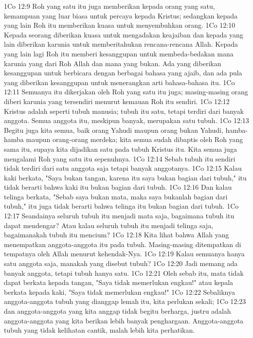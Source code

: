 1Co 12:9  Roh yang satu itu juga memberikan kepada orang yang satu, kemampuan yang luar biasa untuk percaya kepada Kristus; sedangkan kepada yang lain Roh itu memberikan kuasa untuk menyembuhkan orang.
1Co 12:10  Kepada seorang diberikan kuasa untuk mengadakan keajaiban dan kepada yang lain diberikan karunia untuk memberitahukan rencana-rencana Allah. Kepada yang lain lagi Roh itu memberi kesanggupan untuk membeda-bedakan mana karunia yang dari Roh Allah dan mana yang bukan. Ada yang diberikan kesanggupan untuk berbicara dengan berbagai bahasa yang ajaib, dan ada pula yang diberikan kesanggupan untuk menerangkan arti bahasa-bahasa itu.
1Co 12:11  Semuanya itu dikerjakan oleh Roh yang satu itu juga; masing-masing orang diberi karunia yang tersendiri menurut kemauan Roh itu sendiri.
1Co 12:12  Kristus adalah seperti tubuh manusia; tubuh itu satu, tetapi terdiri dari banyak anggota. Semua anggota itu, meskipun banyak, merupakan satu tubuh.
1Co 12:13  Begitu juga kita semua, baik orang Yahudi maupun orang bukan Yahudi, hamba-hamba maupun orang-orang merdeka; kita semua sudah dibaptis oleh Roh yang sama itu, supaya kita dijadikan satu pada tubuh Kristus itu. Kita semua juga mengalami Roh yang satu itu sepenuhnya.
1Co 12:14  Sebab tubuh itu sendiri tidak terdiri dari satu anggota saja tetapi banyak anggotanya.
1Co 12:15  Kalau kaki berkata, "Saya bukan tangan, karena itu saya bukan bagian dari tubuh," itu tidak berarti bahwa kaki itu bukan bagian dari tubuh.
1Co 12:16  Dan kalau telinga berkata, "Sebab saya bukan mata, maka saya bukanlah bagian dari tubuh," itu juga tidak berarti bahwa telinga itu bukan bagian dari tubuh.
1Co 12:17  Seandainya seluruh tubuh itu menjadi mata saja, bagaimana tubuh itu dapat mendengar? Atau kalau seluruh tubuh itu menjadi telinga saja, bagaimanakah tubuh itu mencium?
1Co 12:18  Kita lihat bahwa Allah yang menempatkan anggota-anggota itu pada tubuh. Masing-masing ditempatkan di tempatnya oleh Allah menurut kehendak-Nya.
1Co 12:19  Kalau semuanya hanya satu anggota saja, manakah yang disebut tubuh?
1Co 12:20  Jadi memang ada banyak anggota, tetapi tubuh hanya satu.
1Co 12:21  Oleh sebab itu, mata tidak dapat berkata kepada tangan, "Saya tidak memerlukan engkau!" atau kepala berkata kepada kaki, "Saya tidak memerlukan engkau!"
1Co 12:22  Sebaliknya anggota-anggota tubuh yang dianggap lemah itu, kita perlukan sekali;
1Co 12:23  dan anggota-anggota yang kita anggap tidak begitu berharga, justru adalah anggota-anggota yang kita berikan lebih banyak penghargaan. Anggota-anggota tubuh yang tidak kelihatan cantik, malah lebih kita perhatikan.
